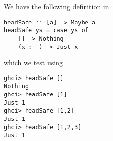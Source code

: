 
We have the following definition in 
\begin{verbatim}
headSafe :: [a] -> Maybe a
headSafe ys = case ys of
    [] -> Nothing
    (x : _) -> Just x
\end{verbatim}
which we test using
\begin{verbatim}
ghci> headSafe []
Nothing
ghci> headSafe [1]
Just 1
ghci> headSafe [1,2]
Just 1
ghci> headSafe [1,2,3]
Just 1
\end{verbatim}
